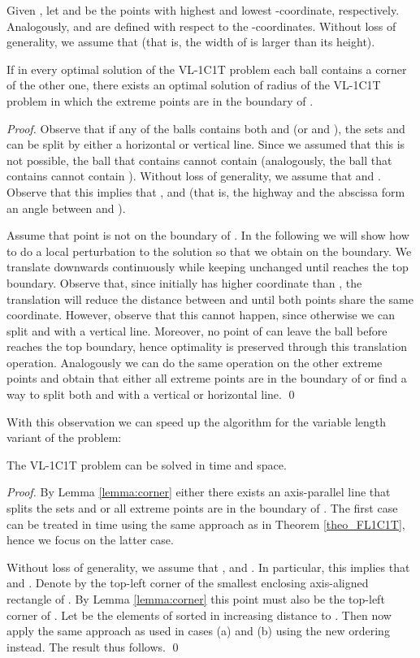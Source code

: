 \documentclass{llncs}
\begin{document}
Given , let  and  be the points with highest and lowest -coordinate, respectively. Analogously,  and  are defined with respect to the -coordinates.
Without loss of generality, we assume that  (that is, the width of  is larger than its height).


\begin{lemma}\label{lemma:corner}
If in every optimal solution of the VL-1C1T problem each ball contains a corner of the other one, there exists an optimal solution  of radius  of the VL-1C1T problem in which the extreme points  are in the boundary of .
\end{lemma}
\begin{proof}
Observe that if any of the balls contains both  and  (or  and ), the sets  and  can be split by either a horizontal or vertical line. Since we assumed that this is not possible, the ball that contains  cannot contain  (analogously, the ball that contains  cannot contain ). Without loss of generality, we assume that  and . Observe that this implies that , and  (that is, the highway and the abscissa form an angle between  and ).

Assume that point  is not on the boundary of . In the following we will show how to do a local perturbation to the solution so that we obtain  on the boundary. We translate  downwards continuously while keeping  unchanged  until  reaches the top boundary. Observe that, since initially  has higher coordinate than , the translation will reduce the distance between  and  until both points share the same  coordinate. However, observe that this cannot happen, since otherwise we can split  and  with a vertical line. Moreover, no point of  can leave the ball before  reaches the top boundary, hence optimality is preserved through this translation operation. Analogously we can do the same operation on the other extreme points and obtain that either all extreme points are in the boundary of   or find a way to split both  and  with a vertical or horizontal line. \qed
\end{proof}

With this observation we can speed up the algorithm for the variable length variant of the problem:

\begin{theorem}\label{theo_vl1C1T}
The VL-1C1T problem can be solved in  time and  space.
\end{theorem}
\begin{proof}
By Lemma \ref{lemma:corner} either there exists an axis-parallel line that splits the sets  and  or all extreme points are in the boundary of . The first case can be treated in   time using the same approach as in Theorem \ref{theo_FL1C1T}, hence we focus on the latter case.

Without loss of generality, we assume that , and .
In particular, this implies that  and . Denote by  the top-left corner of the smallest enclosing axis-aligned rectangle of . By Lemma \ref{lemma:corner} this point must also be the top-left corner of . Let  be the elements of  sorted in increasing  distance to . Then now apply the same approach as used in cases (a) and (b) using the new ordering instead. The result thus follows. \qed
\end{proof}
\end{document}
